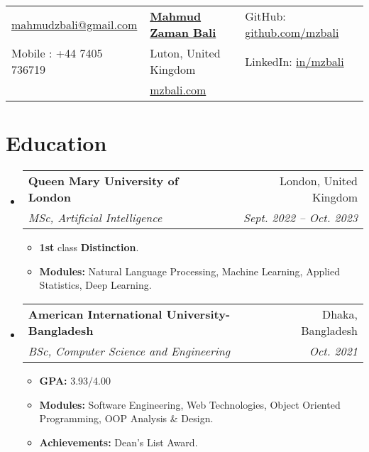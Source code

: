 \documentclass[letterpaper,11pt]{article}
\makeatletter
\newcommand{\resumeItem}[1]{
  \item\small{
    {#1 \vspace{-2pt}}
  }
}
\newcommand{\resumeSubheading}[4]{
  \vspace{-2pt}\item
    \begin{tabular*}{0.97\textwidth}[t]{l@{\extracolsep{\fill}}r}
      \textbf{#1} & #2 \\
      \textit{\small#3} & \textit{\small #4} \\
    \end{tabular*}\vspace{-7pt}
}
\newcommand{\resumeSubHeadingListStart}{\begin{itemize}[leftmargin=0.15in, label={}]}
\newcommand{\resumeSubHeadingListEnd}{\end{itemize}}
\newcommand{\resumeItemListStart}{\begin{itemize}}
\newcommand{\resumeItemListEnd}{\end{itemize}\vspace{-5pt}}
\makeatother
\begin{document}

\begin{tabularx}{\textwidth}{>{\raggedright\arraybackslash}X >{\centering\arraybackslash}X >{\raggedleft\arraybackslash}X}
    \href{mailto:mahmudzbali@gmail.com}{mahmudzbali@gmail.com} & \textbf{\href{https://mzbali.com/}{\Large Mahmud Zaman Bali}} & GitHub: \href{https://github.com/mzbali}{github.com/mzbali} \\
    Mobile : +44 7405 736719 & Luton, United Kingdom & LinkedIn: \href{https://www.linkedin.com/in/mzbali/}{in/mzbali} \\
    & \href{https://mzbali.com/}{mzbali.com} & \\
\end{tabularx}





\section{Education}
  \resumeSubHeadingListStart
    \resumeSubheading
      {Queen Mary University of London}{London, United Kingdom}
      {MSc, Artificial Intelligence}{Sept. 2022 -- Oct. 2023}
      \resumeItemListStart
        \resumeItem{\textbf{1st} class \textbf{Distinction}.}
        \resumeItem{\textbf{Modules:} Natural Language Processing, Machine Learning, Applied Statistics, Deep Learning.}
      \resumeItemListEnd
    \resumeSubheading
      {American International University-Bangladesh}{Dhaka, Bangladesh}
      {BSc, Computer Science and Engineering}{Oct. 2021}
    \resumeItemListStart
        \resumeItem{\textbf{GPA:} 3.93/4.00}
        \resumeItem{\textbf{Modules:} Software Engineering, Web Technologies, Object Oriented Programming, OOP Analysis \& Design.}
        \resumeItem{\textbf{Achievements:} Dean’s List Award.}
    \resumeItemListEnd
  \resumeSubHeadingListEnd


\end{document}
